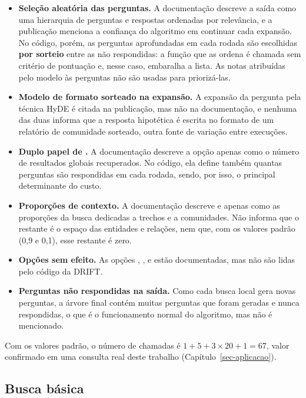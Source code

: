 \begin{itemize}
    \item \textbf{Seleção aleatória das perguntas.} A documentação descreve a saída como uma hierarquia de perguntas e respostas ordenadas por relevância, e a publicação menciona a confiança do algoritmo em continuar cada expansão. No código, porém, as perguntas aprofundadas em cada rodada são escolhidas \textbf{por sorteio} entre as não respondidas: a função que as ordena é chamada sem critério de pontuação e, nesse caso, embaralha a lista. As notas atribuídas pelo modelo às perguntas não são usadas para priorizá-las.
    \item \textbf{Modelo de formato sorteado na expansão.} A expansão da pergunta pela técnica HyDE é citada na publicação, mas não na documentação, e nenhuma das duas informa que a resposta hipotética é escrita no formato de um relatório de comunidade sorteado, outra fonte de variação entre execuções.
    \item \textbf{Duplo papel de .} A documentação descreve a opção apenas como o número de resultados globais recuperados. No código, ela define também quantas perguntas são respondidas em cada rodada, sendo, por isso, o principal determinante do custo.
    \item \textbf{Proporções de contexto.} A documentação descreve  e  apenas como as proporções da busca dedicadas a trechos e a comunidades. Não informa que o restante é o espaço das entidades e relações, nem que, com os valores padrão (0,9 e 0,1), esse restante é zero.
    \item \textbf{Opções sem efeito.} As opções , ,  e  estão documentadas, mas não são lidas pelo código da DRIFT.
    \item \textbf{Perguntas não respondidas na saída.} Como cada busca local gera novas perguntas, a árvore final contém muitas perguntas que foram geradas e nunca respondidas, o que é o funcionamento normal do algoritmo, mas não é mencionado.
\end{itemize}

Com os valores padrão, o número de chamadas é $1 + 5 + 3 \times 20 + 1 = 67$, valor confirmado em uma consulta real deste trabalho (Capítulo~\ref{sec-aplicacao}).

\subsection{Busca básica}
\label{sec-graphrag-consultas-basic}

